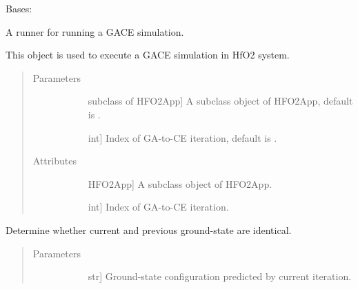 \documentclass[letterpaper,10pt,english]{sphinxmanual}
\begin{document}
\begin{fulllineitems}
\label{\detokenize{pygace.examples.hfo2:pygace.examples.hfo2.hfo2_gace.Runner}}
Bases: {\hyperref[\detokenize{pygace:pygace.gace.AbstractRunner}]{}}

A runner for running a GACE simulation.

This object is used to execute a GACE simulation in HfO2 system.
\begin{quote}\begin{description}
\item[{Parameters}] \leavevmode\begin{description}
\item[{}] \leavevmode{[}subclass of HFO2App{]}
A subclass object of HFO2App, default is .

\item[{}] \leavevmode{[}int{]}
Index of GA-to-CE iteration, default is .

\end{description}

\item[{Attributes}] \leavevmode\begin{description}
\item[{}] \leavevmode{[}HFO2App{]}
A subclass object of HFO2App.

\item[{}] \leavevmode{[}int{]}
Index of GA-to-CE iteration.

\end{description}

\end{description}\end{quote}

\begin{fulllineitems}
\label{\detokenize{pygace.examples.hfo2:pygace.examples.hfo2.hfo2_gace.Runner.compare_gs}}
Determine whether current and previous ground-state are identical.
\begin{quote}\begin{description}
\item[{Parameters}] \leavevmode\begin{description}
\item[{}] \leavevmode{[}str{]}
Ground-state configuration predicted by current iteration.


\end{description}
\end{description}
\end{quote}
\end{fulllineitems}
\end{fulllineitems}
\end{document}
